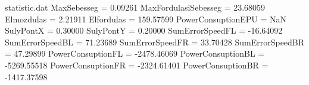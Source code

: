 \begin{filecontents*}{statistic.dat}
MaxSebesseg =    0.09261
MaxFordulasiSebesseg =   23.68059
Elmozdulas =    2.21911
Elfordulas =  159.57599
PowerConsuptionEPU =        NaN
SulyPontX =    0.30000
SulyPontY =    0.20000
SumErrorSpeedFL =  -16.64092
SumErrorSpeedBL =   71.23689
SumErrorSpeedFR =   33.70428
SumErrorSpeedBR =   47.29899
PowerConsuptionFL = -2478.46069
PowerConsuptionBL = -5269.55518
PowerConsuptionFR = -2324.61401
PowerConsuptionBR = -1417.37598
\end{filecontents*}
